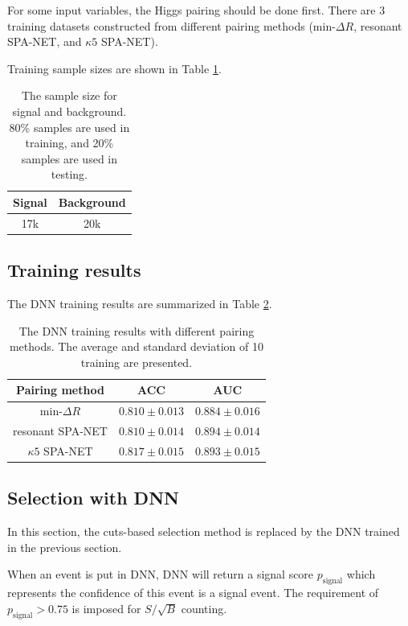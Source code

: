 \documentclass[12pt]{article}
\begin{document}
		For some input variables, the Higgs pairing should be done first. There are 3 training datasets constructed from different pairing methods ($\text{min-}\Delta R$, resonant SPA-NET, and $\kappa 5$ SPA-NET).

		Training sample sizes are shown in Table \ref{tab:DNN_sample_size}.
		\begin{table}[htpb]
			\centering
			\caption{The sample size for signal and background. 80\% samples are used in training, and 20\% samples are used in testing.}
			\label{tab:DNN_sample_size}
			\begin{tabular}{c|c}
			 Signal & Background\\ \hline
			 17k      & 20k      
			\end{tabular}
		\end{table}

	\subsection{Training results}%
	\label{sub:training_results}
		The DNN training results are summarized in Table \ref{tab:DNN_results}.
		\begin{table}[htpb]
			\centering
			\caption{The DNN training results with different pairing methods. The average and standard deviation of 10 training are presented.}
			\label{tab:DNN_results}
			\begin{tabular}{c|cc}
			Pairing method        & ACC     & AUC   \\ \hline
			$\text{min-}\Delta R$ & $0.810 \pm 0.013$ & $0.884 \pm 0.016$ \\
			resonant SPA-NET      & $0.810 \pm 0.014$ & $0.894 \pm 0.014$ \\
			$\kappa 5$ SPA-NET    & $0.817 \pm 0.015$ & $0.893 \pm 0.015$
			\end{tabular}      
		\end{table}
	
	\subsection{Selection with DNN}%
	\label{sub:selection_with_dnn}
	In this section, the cuts-based selection method is replaced by the DNN trained in the previous section. 

	When an event is put in DNN, DNN will return a signal score $p_{\text{signal}}$ which represents the confidence of this event is a signal event. The requirement of $p_{\text{signal}} > 0.75$ is imposed for $S / \sqrt{B}$ counting.
\end{document}

